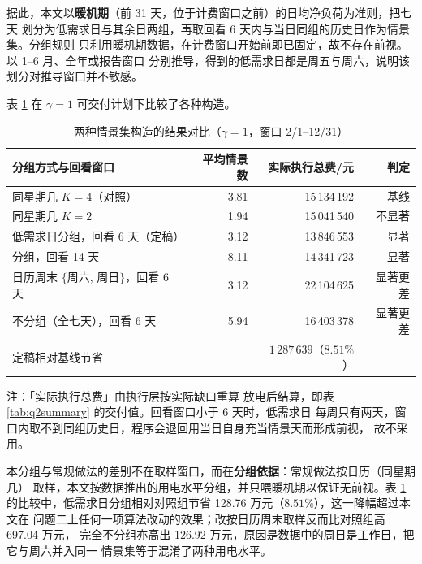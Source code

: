 \documentclass[withoutpreface]{cumcmthesis}
\renewcommand{\emph}[1]{\textbf{#1}}
\newcommand{\hd}[1]{\textbf{#1}}
\begin{document}
据此，本文以\emph{暖机期}（前 31 天，位于计费窗口之前）的日均净负荷为准则，把七天
划分为低需求日与其余日两组，再取回看 6 天内与当日同组的历史日作为情景集。分组规则
只利用暖机期数据，在计费窗口开始前即已固定，故不存在前视。以 1--6 月、全年或报告窗口
分别推导，得到的低需求日都是周五与周六，说明该划分对推导窗口并不敏感。

表 \ref{tab:q2scen} 在 $\gamma=1$ 可交付计划下比较了各种构造。

\begin{table}[!htbp]
  \centering
  \caption{两种情景集构造的结果对比（$\gamma=1$，窗口 2/1--12/31）}
  \label{tab:q2scen}
  \begin{tabular}{l r r r}
    \toprule[1.5pt]
    \hd{分组方式与回看窗口} & \hd{平均情景数} & \hd{实际执行总费/元} & \hd{判定}\\
    \midrule[1pt]
    同星期几 $K=4$（对照）        & 3.81 & 15\,134\,192 & 基线\\
    同星期几 $K=2$                & 1.94 & 15\,041\,540 & 不显著\\
    低需求日分组，回看 6 天（定稿） & 3.12 & 13\,846\,553
      & 显著\\
    \quad 分组，回看 14 天        & 8.11 & 14\,341\,723 & 显著\\
    \quad 日历周末 $\{$周六, 周日$\}$，回看 6 天 & 3.12 & 22\,104\,625
      & 显著更差\\
    \quad 不分组（全七天），回看 6 天 & 5.94 & 16\,403\,378 & 显著更差\\
    \midrule[1pt]
    定稿相对基线节省 & & $1\,287\,639$（$8.51\%$） & \\
    \bottomrule[1.5pt]
  \end{tabular}

  \vspace{2pt}
  \parbox{0.95\textwidth}{ 注：「实际执行总费」由执行层按实际缺口重算
  放电后结算，即表 \ref{tab:q2summary} 的交付值。回看窗口小于 6 天时，低需求日
  每周只有两天，窗口内取不到同组历史日，程序会退回用当日自身充当情景天而形成前视，
  故不采用。}
\end{table}

本分组与常规做法的差别不在取样窗口，而在\emph{分组依据}：常规做法按日历（同星期几）
取样，本文按数据推出的用电水平分组，并只喂暖机期以保证无前视。表 \ref{tab:q2scen}
的比较中，低需求日分组相对对照组节省 128.76 万元（$8.51\%$），这一降幅超过本文在
问题二上任何一项算法改动的效果；改按日历周末取样反而比对照组高 697.04 万元，
完全不分组亦高出 126.92 万元，原因是数据中的周日是工作日，把它与周六并入同一
情景集等于混淆了两种用电水平。
\end{document}
